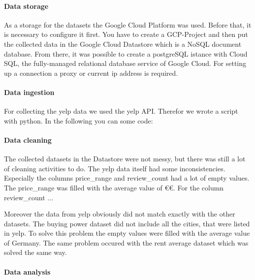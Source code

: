 \paragraph{Data storage}
\label{subsec:Data storage}
As a storage for the datasets the Google Cloud Platform was used. Before that, it is necessary to configure it first. You have to create a GCP-Project and then put the collected data in the Google Cloud Datastore which is a NoSQL document database. From there, it was possible to create a postgreSQL istance with Cloud SQL, the fully-managed relational database service of Google Cloud. For setting up a connection a proxy or current ip address is required.
\paragraph{Data ingestion}
\label{subsec:Data ingestion}
For collecting the yelp data we used the yelp API. Therefor we wrote a script with python. In the following you can some code:
\paragraph{Data cleaning}
\label{subsec:Data cleaning}
The collected datasets in the Datastore were not messy, but there was still a lot of cleaning activities to do. The yelp data itself had some inconsistencies. Especially the columns price\_range and review\_count had a lot of empty values. The price\_range was filled with the average value of \euro\euro. For the column review\_count ...%

Moreover the data from yelp obviously did not match exactly with the other datasets. The buying power dataset did not include all the cities, that were listed in yelp. To solve this problem the empty values were filled with the average value of Germany. The same problem occured with the rent average dataset which was solved the same way.

\paragraph{Data analysis}
\label{subsec:Data analysis}
